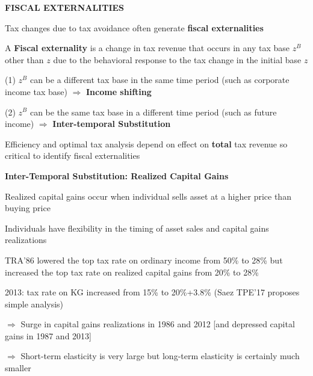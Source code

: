 \documentclass[landscape]{slides}
\begin{document}
%
%
%
%

\begin{slide}
\begin{center}
{\bf FISCAL EXTERNALITIES}
\end{center}

Tax changes due to tax avoidance often generate \textbf{fiscal externalities}

A {\bf Fiscal externality} is a change in tax revenue that occurs
in any tax base $z^B$ other than $z$ due to the behavioral
response to the tax change in the initial base $z$

(1) $z^B$ can be a different tax base in the same time period
(such as corporate income tax base) $\Rightarrow$ {\bf Income
shifting}

(2) $z^B$ can be the same tax base in a different time period
(such as future income) $\Rightarrow$ {\bf Inter-temporal
Substitution}

Efficiency and optimal tax analysis depend on effect on {\bf
total} tax revenue so critical to identify fiscal externalities
\end{slide}




\begin{slide}
\begin{center}
{\bf Inter-Temporal Substitution: Realized Capital Gains}
\end{center}
Realized capital gains occur when individual sells asset at a
higher price than buying price

Individuals have flexibility in the timing of asset sales and
capital gains realizations

TRA'86 lowered the top tax rate on ordinary income from 50\% to
28\% but increased the top tax rate on realized capital gains from
20\% to 28\%

2013: tax rate on KG increased from 15\% to 20\%+3.8\% (Saez TPE'17 proposes
simple analysis)

$\Rightarrow$ Surge in capital gains realizations in 1986 and 2012 [and
depressed capital gains in 1987 and 2013] 

\normalsize
$\Rightarrow$ Short-term elasticity is very large but long-term
elasticity is certainly much smaller


\end{slide}
\end{document}
